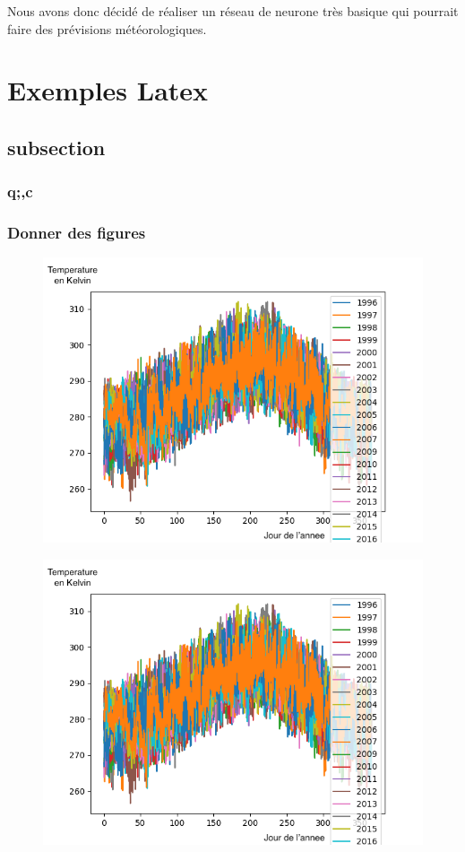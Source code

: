 \documentclass[11pt,a4paper]{article}
\begin{document}
Nous avons donc décidé de réaliser un réseau de neurone très basique qui pourrait faire des prévisions météorologiques.




























\section{Exemples Latex}
\subsection{subsection}
\subsubsection{q;,c}
\subsubsection{Donner des figures}

\begin{figure}
  \includegraphics[width=0.48 \textwidth]{./imagesTIPE/temperature.png}\quad
\end{figure}
\begin{figure}
  \includegraphics[width=0.48 \textwidth]{./imagesTIPE/temperature.png}\quad
\end{figure}
\end{document}
